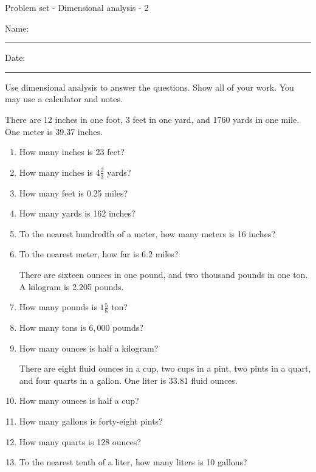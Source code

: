 \documentclass[12pt]{article}
\begin{document}
\pagestyle{empty} %
\begin{center}
          Problem set - Dimensional analysis - 2 \\[0.5in]
\end{center}
Name: \rule{4in}{0.005in} Date: \rule{1.5in}{0.005in} 
  \vspace{0.25in}

Use dimensional analysis to answer the questions. Show all of your work. You may use a calculator and notes. 

There are 12 inches in one foot, 3 feet in one yard, and 1760 yards in one mile. One meter is 39.37 inches. 

\newcommand{\spacing}{\vspace{0.80in}}
\begin{enumerate}
\item How many inches is 23 feet? 
\spacing

\item How many inches is $4\frac{2}{3}$ yards? 
\spacing

\item How many feet is 0.25 miles? 
\spacing

\item How many yards is 162 inches? 
\spacing

\item To the nearest hundredth of a meter, how many meters is 16 inches? 
\spacing

\item To the nearest meter, how far is 6.2 miles? 
\spacing

There are sixteen ounces in one pound, and two thousand pounds in one ton. A kilogram is 2.205 pounds. 

\item How many pounds is $1\frac{5}{8}$ ton? 
\spacing

\item How many tons is $6,000$ pounds? 
\spacing

\item How many ounces is half a kilogram?  
\spacing

There are eight fluid ounces in a cup, two cups in a pint, two pints in a quart, and four quarts in a gallon. One liter is 33.81 fluid ounces. 

\item How many ounces is half a cup? 
\spacing

\item How many gallons is forty-eight pints?  
\spacing

\item How many quarts is 128 ounces? 
\spacing

\item To the nearest tenth of a liter, how many liters is 10 gallons? 
\spacing

\end{enumerate}
\end{document}
